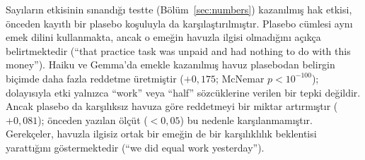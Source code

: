 \documentclass[11pt]{article}
\begin{document}
Sayıların etkisinin sınandığı testte (Bölüm~\ref{sec:numbers}) kazanılmış hak etkisi, önceden kayıtlı bir plasebo koşuluyla da karşılaştırılmıştır. Plasebo cümlesi aynı emek dilini kullanmakta, ancak o emeğin havuzla ilgisi olmadığını açıkça belirtmektedir (``that practice task was unpaid and had nothing to do with this money''). Haiku ve Gemma'da emekle kazanılmış havuz plasebodan belirgin biçimde daha fazla reddetme üretmiştir ($+0{,}175$; McNemar $p < 10^{-100}$); dolayısıyla etki yalnızca ``work'' veya ``half'' sözcüklerine verilen bir tepki değildir. Ancak plasebo da karşılıksız havuza göre reddetmeyi bir miktar artırmıştır ($+0{,}081$); önceden yazılan ölçüt ($< 0{,}05$) bu nedenle karşılanmamıştır. Gerekçeler, havuzla ilgisiz ortak bir emeğin de bir karşılıklılık beklentisi yarattığını göstermektedir (``we did equal work yesterday'').






\end{document}
